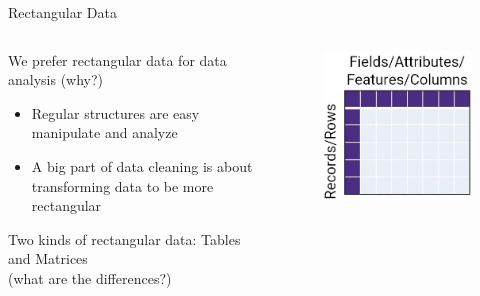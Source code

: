 \documentclass[aspectratio=169]{../latex_main/tntbeamer}  %
\begin{document}
	
	\begin{frame}{Rectangular Data}
	   \begin{columns}
	   
	   
	   \begin{column}{.7\textwidth}
	    
	   
	    We prefer rectangular data for data analysis (why?)
	    \begin{itemize}
	        \item Regular structures are easy manipulate and analyze
	        \item A big part of data cleaning is about transforming data to be more rectangular
	    \end{itemize}
	    
        Two kinds of rectangular data: Tables and Matrices \\
		\centering	(what are the differences?)
		\end{column}
		
	   \begin{column}{.3\textwidth}
	   \begin{figure}
	       		    \includegraphics[scale=.3]{Bild8}
	   \end{figure}

		\end{column}
		\end{columns}
		

\end{frame}
\end{document}
